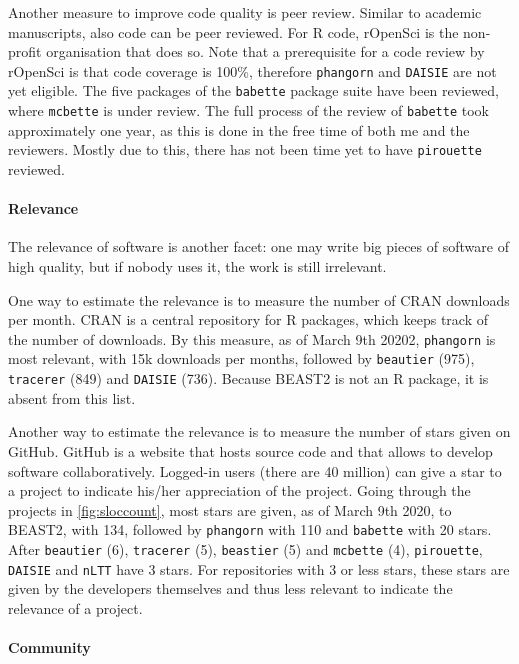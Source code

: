 Another measure to improve code quality is peer review. Similar to
academic manuscripts, also code can be peer reviewed. 
For R code, rOpenSci is the non-profit organisation that does so.
Note that a prerequisite for a code review by rOpenSci is that code coverage is 100\%,
therefore \verb;phangorn; and \verb;DAISIE; are not yet eligible.
The five packages of the \verb;babette; package suite have been reviewed, 
where \verb;mcbette; is under review. 
The full process of the review of \verb;babette; took approximately one year,
as this is done in the free time of both me and the reviewers.
Mostly due to this, there has not been time yet to have \verb;pirouette; reviewed.

\paragraph{Relevance}

The relevance of software is another facet: one may write big pieces
of software of high quality, but if nobody uses it, the work is 
still irrelevant.

One way to estimate the relevance is to measure the number of CRAN downloads
per month. CRAN is a central repository for R packages, which keeps
track of the number of downloads. By this measure, as of March 9th 20202,
\verb;phangorn; is most relevant, with 15k downloads per months, followed 
by \verb;beautier; (975), \verb;tracerer; (849) and \verb;DAISIE; (736). Because BEAST2
is not an R package, it is absent from this list.

Another way to estimate the relevance is to measure the number of stars
given on GitHub. GitHub is a website that hosts source code
and that allows to develop software collaboratively.
Logged-in users (there are 40 million) can give a star to a project
to indicate his/her appreciation of the project.
Going through the projects in \ref{fig:sloccount}, most stars
are given, as of March 9th 2020, to BEAST2, with 134, followed
by \verb;phangorn; with 110 and \verb;babette; with 20 stars.
After \verb;beautier; (6), \verb;tracerer; (5), \verb;beastier; (5)
and \verb;mcbette; (4), \verb;pirouette;, \verb;DAISIE; and \verb;nLTT; have 3 stars.
For repositories with 3 or less stars, these stars are given by
the developers themselves and thus less relevant to indicate
the relevance of a project.

\paragraph{Community}

